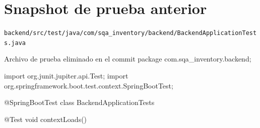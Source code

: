\documentclass[11pt,oneside]{report}
\begin{document}
\section{Snapshot de prueba anterior}
\noindent\nolinkurl{backend/src/test/java/com/sqa_inventory/backend/BackendApplicationTests.java}
\begin{codewindow}[language=Java]{Archivo de prueba eliminado en el commit}
package com.sqa_inventory.backend;

import org.junit.jupiter.api.Test;
import org.springframework.boot.test.context.SpringBootTest;

@SpringBootTest
class BackendApplicationTests {

    @Test
    void contextLoads() {
    }

}
\end{codewindow}
\end{document}

